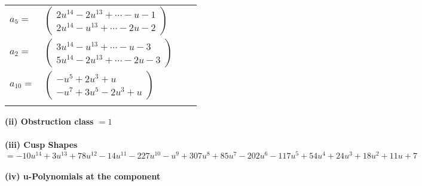 \documentclass[1p]{elsarticle_modified}
\theoremstyle{definition}
\begin{document}
\begin{tabular}{m{7pt} m{180pt} m{7pt} m{180pt} }
\flushright $a_{5}=$&$\begin{pmatrix}2 u^{14}-2 u^{13}+\cdots- u-1\\2 u^{14}- u^{13}+\cdots-2 u-2\end{pmatrix}$ \\
\flushright $a_{2}=$&$\begin{pmatrix}3 u^{14}- u^{13}+\cdots- u-3\\5 u^{14}-2 u^{13}+\cdots-2 u-3\end{pmatrix}$ \\
\flushright $a_{10}=$&$\begin{pmatrix}- u^5+2 u^3+u\\- u^7+3 u^5-2 u^3+u\end{pmatrix}$\\&\end{tabular}
\flushleft \textbf{(ii) Obstruction class $= 1$}\\~\\
\flushleft \textbf{(iii) Cusp Shapes $= -10 u^{14}+3 u^{13}+78 u^{12}-14 u^{11}-227 u^{10}- u^9+307 u^8+85 u^7-202 u^6-117 u^5+54 u^4+24 u^3+18 u^2+11 u+7$}\\~\\
\newpage\renewcommand{\arraystretch}{1}
\flushleft \textbf{(iv) u-Polynomials at the component}\newline \\
\end{document}
